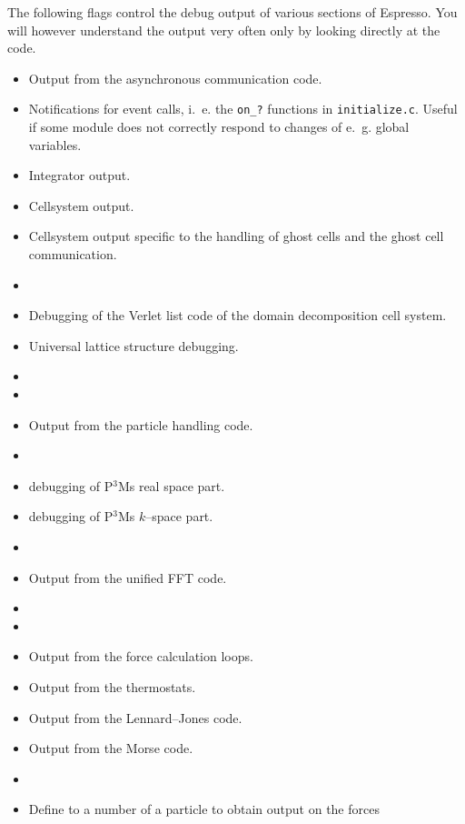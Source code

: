 The following flags control the debug output of various sections of Espresso. You will however
understand the output very often only by looking directly at the code.
\begin{itemize}
\item {} Output from the asynchronous communication code.
\item {} Notifications for event calls, i.~e. the \texttt{on\_?} functions
  in \texttt{initialize.c}. Useful if some module does not correctly respond to changes of e.~g.
  global variables.
\item {} Integrator output.
\item {} Cellsystem output.
\item {} Cellsystem output specific to the handling of ghost cells and the
  ghost cell communication.
\item {}
\item {} Debugging of the Verlet list code of the domain decomposition cell
  system.
\item {} Universal lattice structure debugging.
\item {}
\item {}
\item {} Output from the particle handling code.
\item {}
\item {} debugging of P$^3$Ms real space part.
\item {} debugging of P$^3$Ms $k$--space part.
\item {}
\item {} Output from the unified FFT code.
\item {}
\item {}
\item {} Output from the force calculation loops.
\item {} Output from the thermostats.
\item {} Output from the Lennard--Jones code.
\item {} Output from the Morse code.
\item {}
\item {} Define to a number of a particle to obtain output on the forces

\end{itemize}
